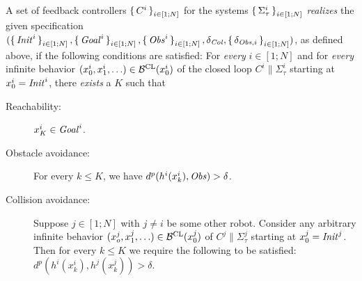 A set of feedback controllers $\set{C^i}_{i\in [1;N]}$ for the systems $\set{\Sigma_\tau^i}_{i\in [1;N]}$ \emph{realizes} the given specification $(\set{\mathit{Init}^i}_{i\in [1;N]}, \set{\mathit{Goal}^i}_{i\in [1;N]}, \set{\mathit{Obs}^i}_{i\in [1;N]}, \delta_{\mathit{Col}}, \set{\delta_{\mathit{Obs},i}}_{i\in [1;N]})$, as defined above, if the following conditions are satisfied:
For \emph{every} $i\in [1;N]$ and for \emph{every} infinite behavior $(x_0^i,x_1^i,\ldots)\in \mathcal{B}^{\mathrm{CL}}(x_0^i)$ of the closed loop $C^i\parallel \Sigma_\tau^i$ starting at $x_0^i=\mathit{Init}^i$, there \emph{exists} a $K$ such that
\begin{description}
	\item[Reachability:] $x_K^i\in \mathit{Goal}^i$.
	\item[Obstacle avoidance:] For every $k\leq K$, we have $d^{p}(h^i(x_k^i),\mathit{Obs}) > \delta$.
	\item[Collision avoidance:] 
		Suppose $j\in [1;N]$ with $j\neq i$ be some other robot.
		Consider any arbitrary infinite behavior $(x_o^j, x_1^j,\ldots)\in \mathcal{B}^{\mathrm{CL}}(x_0^j)$ of $C^j\parallel \Sigma_\tau^j$ starting at $x_0^j=\mathit{Init}^j$. 
		Then for every $k\leq K$ we require the following to be satisfied: $d^{p}(h^i(x^i_k),h^j(x^j_k))>\delta$.
\end{description}

